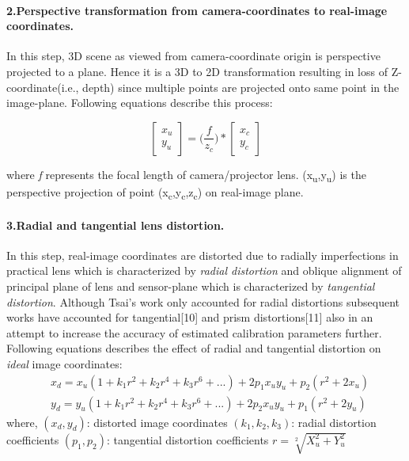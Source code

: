   
  
\paragraph{2.Perspective transformation from camera-coordinates to real-image coordinates.}  
In this step, 3D scene as viewed from camera-coordinate origin is perspective projected to a plane. Hence it is a 3D to 2D transformation resulting in loss of Z-coordinate(i.e., depth) since multiple points are projected onto same point in the image-plane. Following equations describe this process:  
  
\begin{equation}  
\begin{bmatrix}  
x_u \\  
y_u  
\end{bmatrix}  
=\bigg(\frac{f}{z_c}\bigg)*  
\begin{bmatrix}  
x_c \\  
y_c  
\end{bmatrix}  
\end{equation}  
  
\noindent  
where \textit{f} represents the focal length of camera/projector lens. (x\textsubscript{u},y\textsubscript{u}) is the perspective projection of point (x\textsubscript{c},y\textsubscript{c},z\textsubscript{c}) on real-image plane.  
  
\paragraph{3.Radial and tangential lens distortion.}  
In this step, real-image coordinates are distorted due to radially imperfections in practical lens which is characterized by \textit{radial distortion} and oblique alignment of principal plane of lens and sensor-plane which is characterized by \textit{tangential distortion}. Although Tsai's work only accounted for radial distortions subsequent works have accounted for tangential[10] and prism distortions[11] also in an attempt to increase the accuracy of estimated calibration parameters further. Following equations describes the effect of radial and tangential distortion on \textit{ideal} image coordinates:  
\begin{equation}  
\begin{aligned}
& x_d=x_u(1+k_1r^2+k_2r^4+k_3r^6+...)+2p_1x_uy_u+p_2(r^2+2x_u) \\
& y_d=y_u(1+k_1r^2+k_2r^4+k_3r^6+...)+2p_2x_uy_u+p_1(r^2+2y_u)
\end{aligned}
\end{equation}  
\noindent  
where,\newline
$(x_d,y_d)$: distorted image coordinates\newline
$(k_1,k_2,k_3)$: radial distortion coefficients\newline
$(p_1,p_2)$: tangential distortion coefficients\newline
$r=\sqrt[2]{X_u^2+Y_u^2}$
  
